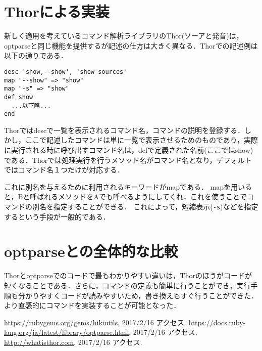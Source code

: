 \documentclass[a4j,twocolumn]{jsarticle}
\begin{document}
\section{Thorによる実装}
新しく適用を考えているコマンド解析ライブラリのThor(ソーアと発音)は，optparseと同じ機能を提供するが記述の仕方は大きく異なる．Thorでの記述例は以下の通りである．
\begin{lstlisting}[style=customRuby,basicstyle={\scriptsize\ttfamily}]
desc 'show,--show', 'show sources'
map "--show" => "show"
map "-s" => "show"
def show
  ...以下略...
end
\end{lstlisting}
Thorではdescで一覧を表示されるコマンド名，コマンドの説明を登録する．しかし，ここで記述したコマンドは単に一覧で表示させるためのものであり，実際に実行される時に呼び出すコマンド名は，defで定義された名前(ここではshow)である．Thorでは処理実行を行うメソッド名がコマンド名となり，デフォルトではコマンド名１つだけが対応する．

これに別名を与えるために利用されるキーワードがmapである．
mapを用いると，Bと呼ばれるメソッドをAでも呼べるようにしてくれ，これを使うことでコマンドの別名を指定することができる．
これによって，短縮表示(\verb|-s|)などを指定するという手段が一般的である．

\section{optparseとの全体的な比較}
Thorとoptparseでのコードで最もわかりやすい違いは，Thorのほうがコードが短くなることである．さらに，コマンドの定義も簡単に行うことができ，実行手順も分かりやすくコードが読みやすいため，書き換えもすぐ行うことができた．より直感的にコマンドを実装することが可能となった．

\begin{thebibliography}{9}
 \url{https://rubygems.org/gems/hikiutils}, 2017/2/16 アクセス.
 \url{https://docs.ruby-lang.org/ja/latest/library/optparse.html}, 2017/2/16 アクセス.
\url{http://whatisthor.com}, 2017/2/16 アクセス.
\end{thebibliography}
\end{document}
